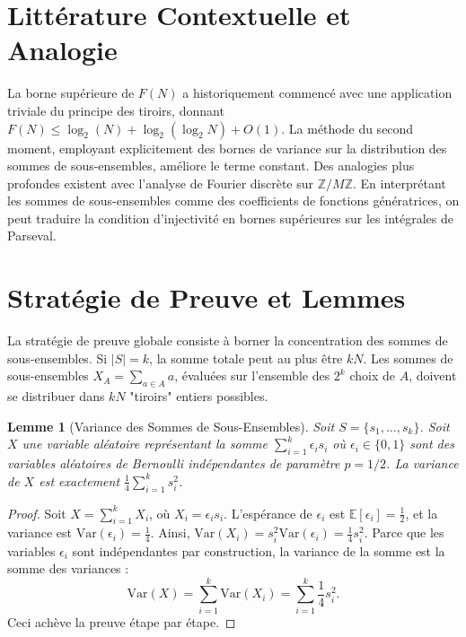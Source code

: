 \documentclass[12pt, a4paper, french]{article}
\newtheorem{lemma}[theorem]{Lemme}
\theoremstyle{definition}
\begin{document}
\section{Littérature Contextuelle et Analogie}
La borne supérieure de $F(N)$ a historiquement commencé avec une application triviale du principe des tiroirs, donnant $F(N) \le \log_2(N) + \log_2(\log_2 N) + O(1)$. La méthode du second moment, employant explicitement des bornes de variance sur la distribution des sommes de sous-ensembles, améliore le terme constant. Des analogies plus profondes existent avec l'analyse de Fourier discrète sur $\mathbb{Z}/M\mathbb{Z}$. En interprétant les sommes de sous-ensembles comme des coefficients de fonctions génératrices, on peut traduire la condition d'injectivité en bornes supérieures sur les intégrales de Parseval.

\section{Stratégie de Preuve et Lemmes}
La stratégie de preuve globale consiste à borner la concentration des sommes de sous-ensembles. Si $|S| = k$, la somme totale peut au plus être $kN$. Les sommes de sous-ensembles $X_A = \sum_{a \in A} a$, évaluées sur l'ensemble des $2^k$ choix de $A$, doivent se distribuer dans $kN$ "tiroirs" entiers possibles.

\begin{lemma}[Variance des Sommes de Sous-Ensembles]
Soit $S = \{s_1, \dots, s_k\}$. Soit $X$ une variable aléatoire représentant la somme $\sum_{i=1}^k \epsilon_i s_i$ où $\epsilon_i \in \{0, 1\}$ sont des variables aléatoires de Bernoulli indépendantes de paramètre $p=1/2$. La variance de $X$ est exactement $\frac{1}{4} \sum_{i=1}^k s_i^2$.
\end{lemma}
\begin{proof}
Soit $X = \sum_{i=1}^k X_i$, où $X_i = \epsilon_i s_i$. L'espérance de $\epsilon_i$ est $\mathbb{E}[\epsilon_i] = \frac{1}{2}$, et la variance est $\text{Var}(\epsilon_i) = \frac{1}{4}$. Ainsi, $\text{Var}(X_i) = s_i^2 \text{Var}(\epsilon_i) = \frac{1}{4}s_i^2$. Parce que les variables $\epsilon_i$ sont indépendantes par construction, la variance de la somme est la somme des variances :
$$ \text{Var}(X) = \sum_{i=1}^k \text{Var}(X_i) = \sum_{i=1}^k \frac{1}{4} s_i^2. $$
Ceci achève la preuve étape par étape.
\end{proof}
\end{document}
